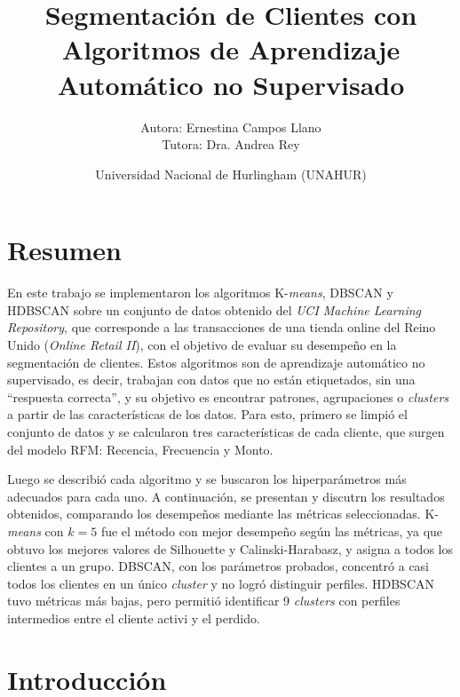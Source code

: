 \documentclass[a4paper,10pts,openany]{book}
\title{Segmentación de Clientes con Algoritmos de Aprendizaje Automático no Supervisado}
\author{Autora: Ernestina Campos Llano \\ Tutora: Dra. Andrea Rey}
\date{Universidad Nacional de Hurlingham (UNAHUR)}
\renewcommand{\listfigurename}{\'Indice de Figuras}
\renewcommand{\listtablename}{\'Indice de Tablas}
\begin{document}
	
	\maketitle
	
	
	\tableofcontents
	
	\renewcommand{\listfigurename}{Índice de Figuras}
	\listoffigures
	
	\renewcommand{\listtablename}{Índice de Tablas}
	\listoftables
	
	
	
	\chapter*{Resumen}
	
	En este trabajo se implementaron los algoritmos K-\emph{means}, DBSCAN y HDBSCAN sobre un conjunto de datos obtenido del \emph{UCI Machine Learning Repository}, que corresponde a las transacciones de una tienda online del Reino Unido (\emph{Online Retail II}), con el objetivo de evaluar su desempeño en la segmentación de clientes. Estos algoritmos son de aprendizaje automático no supervisado, es decir, trabajan con datos que no están etiquetados, sin una ``respuesta correcta'', y su objetivo es encontrar patrones, agrupaciones o \emph{clusters} a partir de las características de los datos. Para esto, primero se limpió el conjunto de datos y se calcularon tres características de cada cliente, que surgen del modelo RFM: Recencia, Frecuencia y Monto.
	
	Luego se describió cada algoritmo y se buscaron los hiperparámetros más adecuados para cada uno. A continuación, se presentan y discutrn los resultados obtenidos, comparando los desempeños mediante las métricas seleccionadas. K-\emph{means} con $k=5$ fue el método con mejor desempeño según las métricas, ya que obtuvo los mejores valores de Silhouette y Calinski-Harabasz, y asigna a todos los clientes a un grupo. DBSCAN, con los parámetros probados, concentró a casi todos los clientes en un único \emph{cluster} y no logró distinguir perfiles. HDBSCAN tuvo métricas más bajas, pero permitió identificar 9 \emph{clusters} con perfiles intermedios entre el cliente activi y el perdido.
		
	
	\chapter{Introducción}
	
\end{document}
